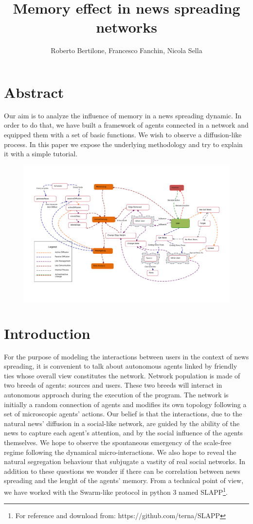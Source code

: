 \documentclass[11pt]{article} %
\title{Memory effect in news spreading networks}
\author{Roberto Bertilone, Francesco Fanchin, Nicola Sella}
\begin{document}
\maketitle

\section*{Abstract}
Our aim is to analyze the influence of memory in a news spreading dynamic. In order to do that, we have built a framework of agents 
connected in a network and equipped them with a set of basic functions. We wish to observe a diffusion-like process.
In this paper we expose the underlying methodology and try to explain it with a simple tutorial.
\begin{figure}[htpb]
  \centering
  \includegraphics[width=\columnwidth]{mindMap.pdf}
\end{figure}
\section{Introduction}

For the purpose of modeling the interactions between users in the context of news spreading, it is convenient to talk about autonomous agents
linked by friendly ties whose overall view constitutes the network.
Network population is made of two breeds of agents: sources and users. These two breeds will interact
in autonomous approach during the execution of the program.
The network is initially a random connection of agents and modifies its own topology following a set of microscopic agents' actions.
Our belief is that the interactions, due to the natural news' diffusion in a social-like network, are guided by the ability of the news
to capture each agent's attention, and by the social influence of the agents themselves.
We hope to observe the spontaneous emergency of the scale-free regime following the dynamical micro-interactions. We also hope to reveal 
the natural segregation behaviour that subjugate a vastity of real social networks.
In addition to these questions we wonder if there can be correlation between news spreading and the lenght of the agents' memory.
From a technical point of view, we have worked with the Swarm-like protocol in python 3 named SLAPP\footnote{For reference and download from: https://github.com/terna/SLAPP}.
\end{document}
